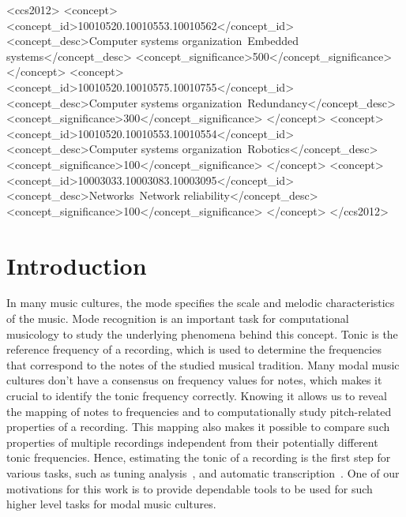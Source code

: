 \documentclass{sig-alternate}
\begin{document}
\maketitle
\begin{abstract}

\end{abstract}

\begin{CCSXML}
<ccs2012>
 <concept>
  <concept_id>10010520.10010553.10010562</concept_id>
  <concept_desc>Computer systems organization~Embedded systems</concept_desc>
  <concept_significance>500</concept_significance>
 </concept>
 <concept>
  <concept_id>10010520.10010575.10010755</concept_id>
  <concept_desc>Computer systems organization~Redundancy</concept_desc>
  <concept_significance>300</concept_significance>
 </concept>
 <concept>
  <concept_id>10010520.10010553.10010554</concept_id>
  <concept_desc>Computer systems organization~Robotics</concept_desc>
  <concept_significance>100</concept_significance>
 </concept>
 <concept>
  <concept_id>10003033.10003083.10003095</concept_id>
  <concept_desc>Networks~Network reliability</concept_desc>
  <concept_significance>100</concept_significance>
 </concept>
</ccs2012>  
\end{CCSXML}


\printccsdesc


\section{Introduction}\label{sec:introduction}
In many music cultures, the mode specifies the scale and melodic characteristics of the music. Mode recognition is an important task for computational musicology to study the underlying phenomena behind this concept. Tonic is the reference frequency of a recording, which is used to determine the frequencies that correspond to the notes of the studied musical tradition. Many modal music cultures don't have a consensus on frequency values for notes, which makes it crucial to identify the tonic frequency correctly. Knowing it allows us to reveal the mapping of notes to frequencies and to computationally study pitch-related properties of a recording. This mapping also makes it possible to compare such properties of multiple recordings independent from their potentially different tonic frequencies. Hence, estimating the tonic of a recording is the first step for various tasks, such as tuning analysis~\cite{tuning}, and automatic transcription~\cite{transcription}. One of our motivations for this work is to provide dependable tools to be used for such higher level tasks for modal music cultures.
\end{document}

